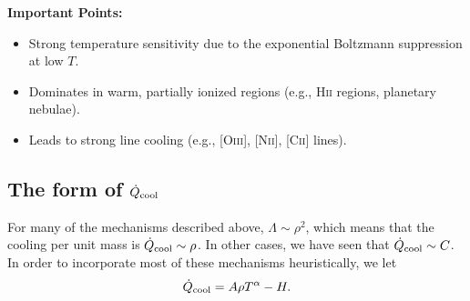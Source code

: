 \textbf{Important Points:}
\begin{itemize}
    \item Strong temperature sensitivity due to the exponential Boltzmann suppression at low \( T \).
    \item Dominates in warm, partially ionized regions (e.g., H\textsc{ii} regions, planetary nebulae).
    \item Leads to strong line cooling (e.g., [O\textsc{iii}], [N\textsc{ii}], [C\textsc{ii}] lines).
\end{itemize}

\subsection{The form of $\dot{Q}_{\rm cool}$}
For many of the mechanisms described above, $\Lambda \sim \rho^2$, which means that the cooling per unit mass is $\dot{Q}_{\rm cool} \sim \rho$. In other cases, we have seen that $\dot{Q}_{\rm cool} \sim C$. In order to incorporate most of these mechanisms heuristically, we let
\[
\dot{Q}_{\rm cool} = A\rho T^\alpha - H.
\]
